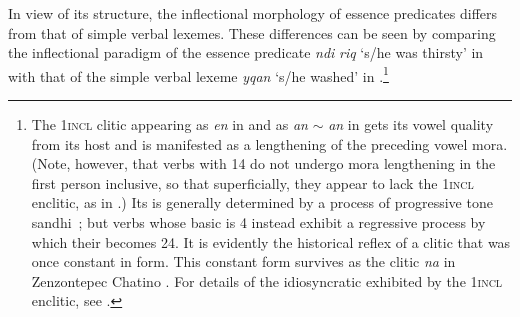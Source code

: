 \documentclass[output=paper]{langsci/langscibook}
\begin{document}
In view of its structure, the inflectional morphology of essence predicates differs from that
of simple verbal lexemes. These differences can be seen by comparing \pagebreak  the inflectional paradigm of the
essence predicate \emph{ndi} \emph{riq} `s/he was thirsty' in  with that of the simple verbal lexeme \emph{yqan}
`s/he washed' in .\footnote{The 1\textsc{incl} clitic appearing as \emph{en} in  and as \emph{an} $\sim$ \emph{an} in  gets its vowel quality from its
host and is manifested as a lengthening of the preceding vowel mora.  (Note, however, that verbs with  14 do not undergo mora lengthening in the first person inclusive, so that superficially, they appear to lack the 1\textsc{incl} enclitic, as in .)  Its  is generally determined by a process of progressive tone sandhi~\citep{Chen2004}; but verbs whose basic  is 4 instead exhibit a regressive process by which their   becomes 24.  It is evidently the historical reflex
of a clitic that was once constant in form. This constant form survives as the clitic \emph{na} in
Zenzontepec Chatino \citep{Campbell2011}.  For details of the idiosyncratic  exhibited by the 1\textsc{incl} enclitic, see \citet{ECruz2011}.} 

  
\end{document}
